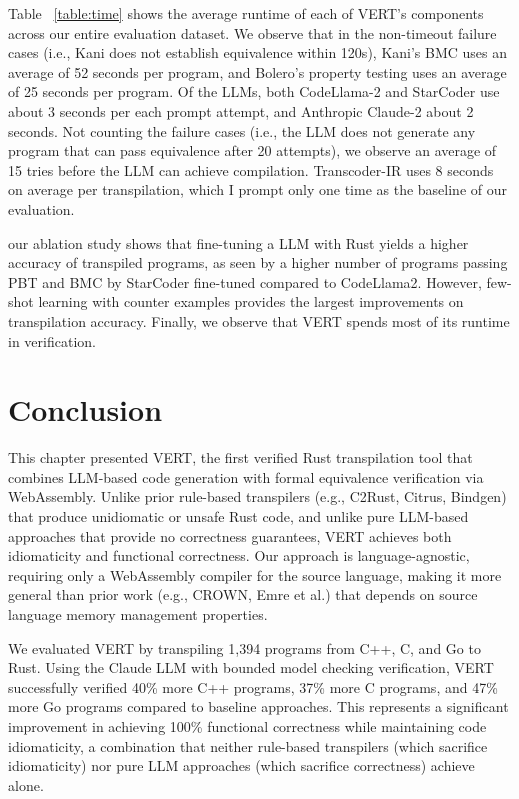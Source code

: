 \documentclass[12pt,openany,oneside,table]{cmuthesis}
\begin{document}
Table ~\ref{table:time} shows the average runtime of each of VERT's
components across our entire evaluation dataset. We observe that in
the non-timeout failure cases (i.e., Kani does not establish
equivalence within 120s), Kani's BMC uses an
average of 52 seconds per program, and Bolero's property testing uses
an average of 25 seconds per program. Of the LLMs, both CodeLlama-2 and StarCoder use about 3 seconds per each prompt attempt, and Anthropic Claude-2 about 2
seconds. Not counting the failure cases (i.e., the LLM does not
generate any program that can pass equivalence after 20 attempts), we
observe an average of 15 tries before the LLM can achieve
compilation. Transcoder-IR uses 8 seconds on average per
transpilation, which I prompt only one time as the baseline of our
evaluation.

\begin{tcolorbox}
[colback=white,colframe=black,arc=0pt,boxrule=0.5pt,title=RQ2 Summary,boxsep=2pt,left=1pt,right=1pt,top=1pt,bottom=1pt,fonttitle=\bfseries]
our ablation study shows that fine-tuning a LLM with Rust yields a higher accuracy of transpiled programs, as seen by a higher number of programs passing PBT and BMC by StarCoder fine-tuned compared to CodeLlama2.
However, few-shot learning with counter examples provides the largest improvements on transpilation accuracy. Finally, we observe that VERT spends most of its runtime in verification.
\end{tcolorbox}


\section{Conclusion}
\label{sec:vert-conclusion}
This chapter presented VERT, the first verified Rust transpilation tool that combines LLM-based code generation with formal equivalence verification via WebAssembly. Unlike prior rule-based transpilers (e.g., C2Rust, Citrus, Bindgen) that produce unidiomatic or unsafe Rust code, and unlike pure LLM-based approaches that provide no correctness guarantees, VERT achieves both idiomaticity and functional correctness. Our approach is language-agnostic, requiring only a WebAssembly compiler for the source language, making it more general than prior work (e.g., CROWN, Emre et al.) that depends on source language memory management properties.

We evaluated VERT by transpiling 1,394 programs from C++, C, and Go to Rust. Using the Claude LLM with bounded model checking verification, VERT successfully verified 40\% more C++ programs, 37\% more C programs, and 47\% more Go programs compared to baseline approaches. This represents a significant improvement in achieving 100\% functional correctness while maintaining code idiomaticity, a combination that neither rule-based transpilers (which sacrifice idiomaticity) nor pure LLM approaches (which sacrifice correctness) achieve alone.
\end{document}
